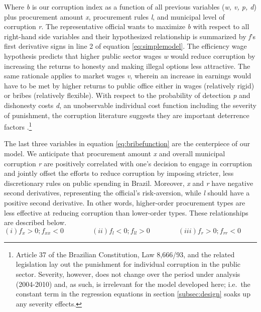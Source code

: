 \documentclass[11pt]{article}
\begin{document}
Where \emph{b} is our corruption index as a function of all previous variables (\emph{w, v, p, d}) plus procurement amount \emph{x}, procurement rules \emph{l}, and municipal level of corruption \emph{r}. The representative official wants to maximize \emph{b} with respect to all right-hand side variables and their hypothesized relationship is summarized by \emph{f}'s first derivative signs in line 2 of equation \ref{eq:simplemodel}. The efficiency wage hypothesis predicts that higher public sector wages \emph{w} would reduce corruption by increasing the returns to honesty and making illegal options less attractive. The same rationale applies to market wages \emph{v}, wherein an increase in earnings would have to be met by higher returns to public office either in wages (relatively rigid) or bribes (relatively flexible). With respect to the probability of detection \emph{p} and dishonesty costs \emph{d}, an unobservable individual cost function including the severity of punishment, the corruption literature suggests they are important deterrence factors \citep{BeckerCrimePunishmentEconomic1968,Rose-AckermanEconomicsCorruption1975}.\footnote{Article 37 of the Brazilian Constitution, Law 8,666/93, and the related legislation lay out the punishment for individual corruption in the public sector. Severity, however, does not change over the period under analysis (2004-2010) and, as such, is irrelevant for the model developed here; i.e.~the constant term in the regression equations in section \ref{subsec:design} soaks up any severity effects.}

The last three variables in equation \ref{eq:bribefunction} are the centerpiece of our model. We anticipate that  procurement amount \emph{x} and overall municipal corruption \emph{r} are positively correlated with one's decision to engage in corruption and jointly offset the efforts to reduce corruption by imposing stricter, less discretionary rules on public spending in Brazil. Moreover, \emph{x} and \emph{r} have negative second derivatives, representing the official's risk-aversion, while \emph{l} should have a positive second derivative. In other words, higher-order procurement types are less effective at reducing corruption than lower-order types. These relationships are described below.
\begin{equation} \label{eq:derivatives}
  (i)   f_{x} > 0; f_{xx} < 0 \qquad \qquad
  (ii)  f_{l} < 0; f_{ll} > 0 \qquad \qquad
  (iii) f_{r} > 0; f_{rr} < 0 \qquad \qquad
\end{equation}
\end{document}
